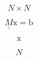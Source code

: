 \documentclass[10pt, twocolumn]{article}
\theoremstyle{definition}
\newcommand{\bv}[1]{\bm{\mathrm{#1}}}
\newcommand{\dul}[1]{\underline{\underline{#1}}}
\begin{document}
$$N\times N$$

$$\dul{M}\bv{x}=\bv{b}$$

$$\bv{x}$$

$$N$$
\end{document}
